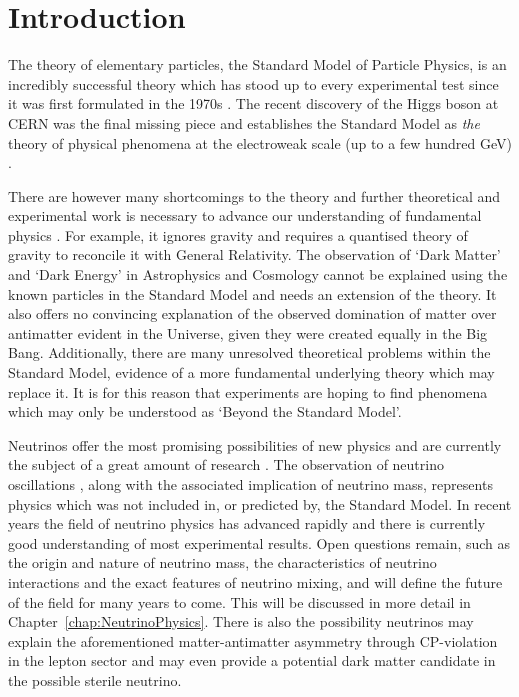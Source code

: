 
\graphicspath{{Introduction/Figs/}}

\chapter{Introduction}\label{chap:Introduction}

The theory of elementary particles, the Standard Model of Particle Physics, is an incredibly successful theory which has stood up to every experimental test since it was first formulated in the 1970s \cite{Glashow1961,Weinberg1967}.  The recent discovery of the Higgs boson at CERN \cite{Aad2012,Chatrchyan2012} was the final missing piece and establishes the Standard Model as \textit{the} theory of physical phenomena at the electroweak scale (up to a few hundred GeV) \cite{Shears2012,Bilenky2015}.

There are however many shortcomings to the theory and further theoretical and experimental work is necessary to advance our understanding of fundamental physics \cite{Ellis2012}.  For example, it ignores gravity and requires a quantised theory of gravity to reconcile it with General Relativity.  The observation of `Dark Matter' and `Dark Energy' in Astrophysics and Cosmology cannot be explained using the known particles in the Standard Model and needs an extension of the theory.  It also offers no convincing explanation of the observed domination of matter over antimatter evident in the Universe, given they were created equally in the Big Bang.  Additionally, there are many unresolved theoretical problems within the Standard Model, evidence of a more fundamental underlying theory which may replace it.  It is for this reason that experiments are hoping to find phenomena which may only be understood as `Beyond the Standard Model'.

Neutrinos offer the most promising possibilities of new physics and are currently the subject of a great amount of research \cite{Bilenky2015}.  The observation of neutrino oscillations \cite{SuperKamiokande1998,SNO2002}, along with the associated implication of neutrino mass, represents physics which was not included in, or predicted by, the Standard Model.  In recent years the field of neutrino physics has advanced rapidly and there is currently good understanding of most experimental results.  Open questions remain, such as the origin and nature of neutrino mass, the characteristics of neutrino interactions and the exact features of neutrino mixing, and will define the future of the field for many years to come.  This will be discussed in more detail in Chapter~\ref{chap:NeutrinoPhysics}.  There is also the possibility neutrinos may explain the aforementioned matter-antimatter asymmetry through CP-violation in the lepton sector and may even provide a potential dark matter candidate in the possible sterile neutrino.

